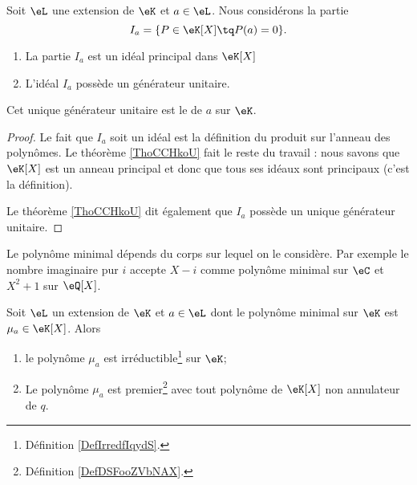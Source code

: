 \begin{lemmaDef}    \label{DefCVMooFGSAgL}
    Soit \( \eL\) une extension de \( \eK\) et \( a\in \eL\). Nous considérons la partie
    \begin{equation}
        I_a=\{ P\in \eK[X]\tq P(a)=0 \}.
    \end{equation}

    \begin{enumerate}
        \item
            La partie \( I_a\) est un idéal principal dans \( \eK[X]\)
        \item
            L'idéal \( I_a\) possède un générateur unitaire.
    \end{enumerate}

    Cet unique générateur unitaire est le  de \( a\) sur \( \eK\).
\end{lemmaDef}

\begin{proof}
    Le fait que \( I_a\) soit un idéal est la définition du produit sur l'anneau des polynômes. Le théorème \ref{ThoCCHkoU} fait le reste du travail : nous savons que \( \eK[X]\) est un anneau principal et donc que tous ses idéaux sont principaux (c'est la définition).
   
    Le théorème \ref{ThoCCHkoU} dit également que \( I_a\) possède un unique générateur unitaire.
\end{proof}

\begin{example}
    Le polynôme minimal dépends du corps sur lequel on le considère. Par exemple le nombre imaginaire pur \( i\) accepte \( X-i\) comme polynôme minimal sur \( \eC\) et \( X^2+1\) sur \( \eQ[X]\).
\end{example}

\begin{proposition}  \label{PropRARooKavaIT}
    Soit \( \eL\) un extension de \( \eK\) et \( a\in \eL\) dont le polynôme minimal sur \( \eK\) est \( \mu_a\in\eK[X]\). Alors
    \begin{enumerate}
        \item   \label{ItemDOQooYpLvXri}
            le polynôme \( \mu_a\) est irréductible\footnote{Définition \ref{DefIrredfIqydS}.} sur \( \eK\);
        \item
            Le polynôme \( \mu_a\) est premier\footnote{Définition \ref{DefDSFooZVbNAX}.} avec tout polynôme de \( \eK[X]\) non annulateur de \( q\).
    \end{enumerate}
\end{proposition}

